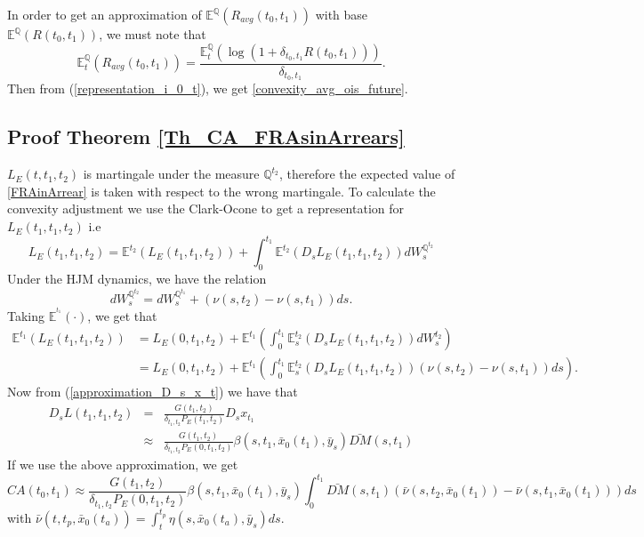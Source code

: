 \documentclass[a4paper,10pt]{article}
\newcommand{\1}{\mathbf{1}}
\begin{document}
In order to get an approximation of $\mathbb{E}^{\mathbb{Q}}\left(R_{avg}(t_0,t_1)\right)$ with base $\mathbb{E}^{\mathbb{Q}}\left(R(t_0,t_1)\right)$, we must note that 
\begin{equation*}
\mathbb{E}_t^{\mathbb{Q}}\left(R_{avg}(t_0,t_1)\right) = \frac{\mathbb{E}_t^{\mathbb{Q}}\left( \log(1+ \delta_{t_0,t_1} R(t_0,t_1))\right)}{ \delta_{t_0,t_1}}.
\end{equation*}
Then from (\ref{representation_i_0_t}), we get \eqref{convexity_avg_ois_future}.

\subsection{Proof Theorem \ref{Th_CA_FRAsinArrears}}\label{Proof_CA_FRAsinArrears}
$L_{E}(t,t_1,t_2)$ is martingale under the measure $\mathbb{Q}^{t_2}$, therefore the expected value of \eqref{FRAinArrear} is taken with respect to the wrong martingale. To calculate the convexity adjustment we use the Clark-Ocone to get a representation for $L_{E}(t_1,t_1,t_2)$ i.e
\begin{equation}\label{general_convexity_fras}
L_{E}(t_1,t_1,t_2) = \mathbb{E}^{t_2}\left(L_{E}(t_1,t_1,t_2) \right) + \int_{0}^{t_1} \mathbb{E}^{t_2}\left(D_s L_{E}(t_1,t_1,t_2) \right) dW^{\mathbb{Q}^{t_2}}_{s}
\end{equation}
Under the HJM dynamics, we have the relation
\begin{equation*}
dW^{\mathbb{Q}^{t_2}}_s = dW^{\mathbb{Q}^{t_1}}_s + (\nu(s,t_2) - \nu(s,t_1)) ds. 
\end{equation*}
Taking $\mathbb{E}^{^{t_1}}(\cdot)$, we get that
\begin{align*}
\mathbb{E}^{t_1}\left(L_{E}(t_1,t_1,t_2) \right) &= L_{E}(0,t_1,t_2) + \mathbb{E}^{t_1}\left( \int_{0}^{t_1} \mathbb{E}_s^{t_2}\left(D_s L_{E}(t_1,t_1,t_2) \right) dW^{t_2}_{s}\right)\\
&= L_{E}(0,t_1,t_2) + \mathbb{E}^{t_1}\left( \int_{0}^{t_1} \mathbb{E}_s^{t_2}\left(D_s L_{E}(t_1,t_1,t_2) \right) (\nu(s,t_2)-\nu(s,t_1)) ds \right).
\end{align*}
Now from (\ref{approximation_D_s_x_t}) we have that 
\begin{eqnarray*}
D_s L(t_1,t_1,t_2) &=& \frac{G(t_1,t_2)}{\delta_{t_1,t_2}P_{E}(t_1,t_2)} D_s x_{t_1}\\
&\approx& \frac{G(t_1,t_2)}{\delta_{t_1,t_2}P_{E}(0,t_1,t_2)} \beta(s,t_1, \bar{x}_0(t_1), \bar{y}_s)\bar{DM}(s,t_1)
\end{eqnarray*}
If we use the above approximation, we get
\begin{equation*}
CA(t_0,t_1) \approx \frac{G(t_1,t_2)}{\delta_{t_1,t_2}P_{E}(0,t_1,t_2)} \beta(s,t_1, \bar{x}_0(t_1), \bar{y}_s) \int_{0}^{t_1} \bar{DM}(s,t_1) (\bar{\nu}(s,t_2,\bar{x}_{0}(t_1))-\bar{\nu}(s,t_1,\bar{x}_{0}(t_1))) ds
\end{equation*}
with $\bar{\nu}(t,t_p, \bar{x}_0(t_a))= \int_{t}^{t_p} \eta(s,\bar{x}_0(t_a),\bar{y}_s) ds$.   
\end{document}

